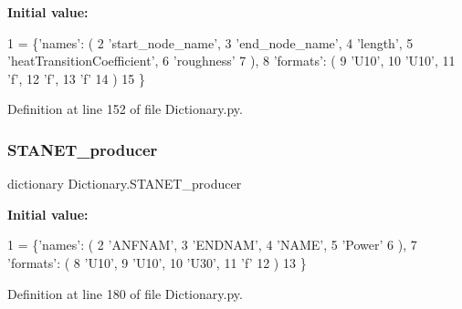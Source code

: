 {\bfseries Initial value\+:}
\begin{DoxyCode}
1 =           \{\textcolor{stringliteral}{'names'}: (
2                                 \textcolor{stringliteral}{'start\_node\_name'},
3                                 \textcolor{stringliteral}{'end\_node\_name'},
4                                 \textcolor{stringliteral}{'length'},
5                                 \textcolor{stringliteral}{'heatTransitionCoefficient'},
6                                 \textcolor{stringliteral}{'roughness'}
7                                 ),
8                        \textcolor{stringliteral}{'formats'}: (
9                                 \textcolor{stringliteral}{'U10'},
10                                 \textcolor{stringliteral}{'U10'},
11                                 \textcolor{stringliteral}{'f'},
12                                 \textcolor{stringliteral}{'f'},
13                                 \textcolor{stringliteral}{'f'}
14                                 )
15                                \}
\end{DoxyCode}


Definition at line 152 of file Dictionary.\+py.

\mbox{\label{namespace_dictionary_aeea7b54a3132a64d164394f80e275ee1}} 
\subsubsection{\texorpdfstring{S\+T\+A\+N\+E\+T\+\_\+producer}{STANET\_producer}}
{\footnotesize\ttfamily dictionary Dictionary.\+S\+T\+A\+N\+E\+T\+\_\+producer}

{\bfseries Initial value\+:}
\begin{DoxyCode}
1 =  \{\textcolor{stringliteral}{'names'}: (
2                             \textcolor{stringliteral}{'ANFNAM'},
3                             \textcolor{stringliteral}{'ENDNAM'},
4                             \textcolor{stringliteral}{'NAME'},
5                             \textcolor{stringliteral}{'Power'}
6                             ),
7                     \textcolor{stringliteral}{'formats'}: (
8                                 \textcolor{stringliteral}{'U10'},
9                                 \textcolor{stringliteral}{'U10'},
10                                 \textcolor{stringliteral}{'U30'},
11                                 \textcolor{stringliteral}{'f'}
12                                 )
13                     \}
\end{DoxyCode}


Definition at line 180 of file Dictionary.\+py.

